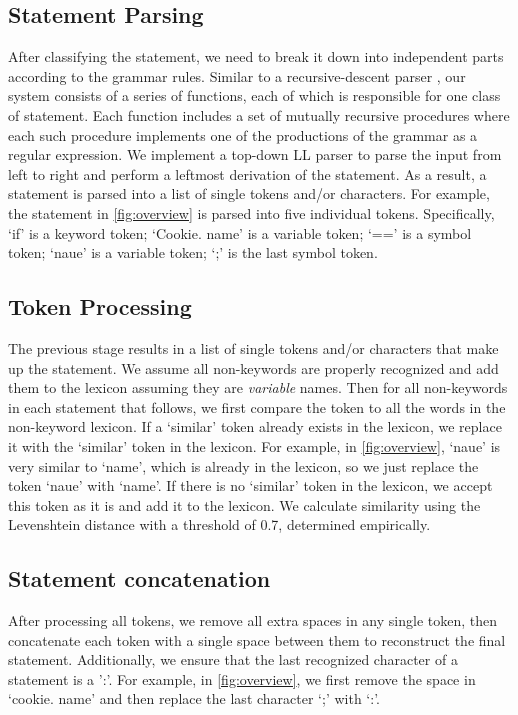 \documentclass{vgtc}                          %
\begin{document}
\subsection{Statement Parsing}
After classifying the statement, we need to break it down into independent parts according to the grammar rules.
Similar to a recursive-descent parser \cite{van1993recursive}, our system consists of a series of functions, each of which is responsible for one class of statement. Each function includes a set of mutually recursive procedures where each such procedure implements one of the productions of the grammar as a regular expression. We implement a top-down LL parser to parse the input from left to right and perform a leftmost derivation \cite{fernau1998regulated} of the statement. As a result, a statement is parsed into a list of single tokens and/or characters. For example, the statement in \autoref{fig:overview} is parsed into five individual tokens. Specifically, `if' is a keyword token; `Cookie. name' is a variable token; `==' is a symbol token; `naue' is a variable token; `;' is the last symbol token.



\subsection{Token Processing}
The previous stage results in a list of single tokens and/or characters that make up the statement.
We assume all non-keywords are properly recognized and add them to the lexicon assuming they are \emph{variable} names.
Then for all non-keywords in each statement that follows, we first compare the token to all the words in the non-keyword lexicon. If a `similar' token already exists in the lexicon, we replace it with the `similar' token in the lexicon. For example, in \autoref{fig:overview}, `naue' is very similar to `name', which is already in the lexicon, so we just replace the token `naue' with `name'. If there is no `similar' token in the lexicon, we accept this token as it is and add it to the lexicon. We calculate similarity using the Levenshtein distance \cite{levenshtein1966binary} with a threshold of 0.7, determined empirically.

\subsection{Statement concatenation}
After processing all tokens, we remove all extra spaces in any single token, then concatenate each token with a single space between them to reconstruct the final statement.
Additionally, we ensure that the last recognized character of a statement is a ':'.
For example, in \autoref{fig:overview}, we first remove the space in `cookie. name' and then replace the last character `;' with `:'.
\end{document}
